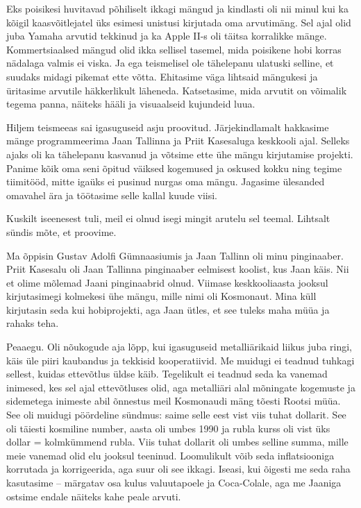 
Eks poisikesi huvitavad põhiliselt ikkagi mängud ja kindlasti oli nii minul  
kui ka kõigil kaasvõitlejatel üks esimesi unistusi 
kirjutada oma arvutimäng. Sel ajal olid juba  
Yamaha arvutid tekkinud ja ka Apple II-s oli täitsa 
korralikke mänge. Kommertsiaalsed mängud olid ikka sellisel 
tasemel, mida poisikene hobi korras nädalaga valmis ei viska. Ja 
ega teismelisel ole tähelepanu ulatuski 
selline, et suudaks midagi pikemat ette võtta. Ehitasime väga 
lihtsaid mängukesi ja üritasime arvutile 
häkkerlikult läheneda. Katsetasime, mida arvutit on 
võimalik tegema panna, näiteks hääli ja visuaalseid kujundeid luua. 

Hiljem teismeeas sai igasuguseid asju proovitud. Järjekindlamalt 
hakkasime mänge programmeerima Jaan Tallinna ja Priit 
Kasesaluga keskkooli ajal. Selleks ajaks oli 
ka tähelepanu 
kasvanud ja võtsime ette ühe mängu kirjutamise projekti. Panime kõik oma seni 
õpitud väiksed kogemused 
ja oskused kokku ning tegime tiimitööd, mitte igaüks ei pusinud nurgas oma 
mängu. Jagasime 
ülesanded omavahel ära ja töötasime selle kallal kuude viisi. 


Kuskilt iseenesest tuli, meil ei olnud isegi
mingit arutelu sel teemal. Lihtsalt sündis mõte, et proovime. 


Ma õppisin Gustav Adolfi Gümnaasiumis
ja Jaan Tallinn oli minu pinginaaber. Priit 
Kasesalu oli Jaan Tallinna pinginaaber eelmisest 
koolist, kus Jaan käis. Nii et olime mõlemad Jaani pinginaabrid olnud. Viimase 
keskkooliaasta jooksul kirjutasimegi kolmekesi ühe mängu, 
mille nimi oli Kosmonaut. Mina küll  
kirjutasin seda kui hobiprojekti, aga Jaan ütles, et see tuleks maha müüa ja 
rahaks teha. 


Peaaegu. Oli nõukogude aja lõpp, kui igasuguseid 
metalliärikaid liikus juba ringi, käis üle piiri  
kaubandus ja tekkisid kooperatiivid. Me 
muidugi ei teadnud tuhkagi sellest, kuidas ettevõtlus 
üldse käib. Tegelikult ei teadnud seda ka vanemad inimesed, kes sel 
ajal ettevõtluses olid, aga metalliäri alal 
mõningate kogemuste ja 
sidemetega inimeste abil õnnestus meil Kosmonaudi mäng tõesti Rootsi müüa. 
See oli muidugi pöördeline sündmus: saime selle eest 
vist viis tuhat 
dollarit. See oli täiesti kosmiline number, aasta oli umbes 1990 ja rubla 
kurss oli vist üks dollar = kolmkümmend rubla. Viis tuhat dollarit 
oli umbes selline summa, mille meie vanemad olid elu jooksul teeninud. 
Loomulikult võib seda inflatsiooniga korrutada ja 
korrigeerida, aga suur oli see ikkagi. Iseasi, kui õigesti me seda raha 
kasutasime -- märgatav osa kulus 
valuutapoele ja Coca-Colale, aga me Jaaniga ostsime endale näiteks kahe 
peale arvuti. 

